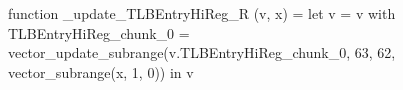 function _update_TLBEntryHiReg_R (v, x) = let v = { v with TLBEntryHiReg_chunk_0 = vector_update_subrange(v.TLBEntryHiReg_chunk_0, 63, 62, vector_subrange(x, 1, 0)) } in v
